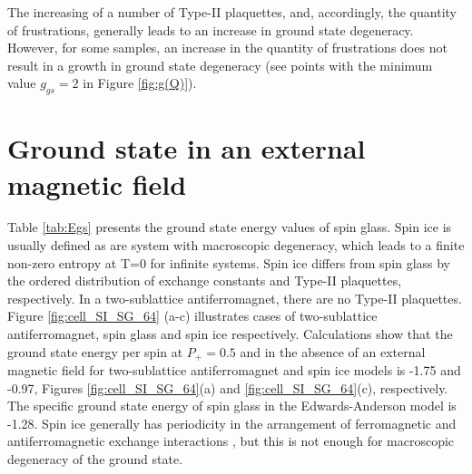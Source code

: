 \documentclass[preprint,12pt]{elsarticle}
\begin{document}
	The increasing of a number of Type-II plaquettes, and, accordingly, the quantity of frustrations, generally leads to an increase in ground state degeneracy. However, for some samples, an increase in the quantity of frustrations does not result in a growth in ground state degeneracy (see points with the minimum value $g_{gs}=2$ in Figure \ref{fig:g(Q)}). 
	
	\section{Ground state in an external magnetic field}
	
	Table \ref{tab:Egs} presents the ground state energy values of spin glass. Spin ice is usually defined as are system with macroscopic degeneracy, which leads to a finite non-zero entropy at T=0 for infinite systems. Spin ice differs from spin glass by the ordered distribution of exchange constants and Type-II plaquettes, respectively. In a two-sublattice antiferromagnet, there are no Type-II plaquettes. Figure \ref{fig:cell_SI_SG_64} (a-c) illustrates cases of two-sublattice antiferromagnet, spin glass and spin ice respectively. Calculations show that the ground state energy per spin at $P_+ = 0.5$ and in the absence of an external magnetic field for two-sublattice antiferromagnet and spin ice models is -1.75 and -0.97, Figures \ref{fig:cell_SI_SG_64}(a) and \ref{fig:cell_SI_SG_64}(c), respectively. The specific ground state energy of spin glass in the Edwards-Anderson model is -1.28. Spin ice generally has periodicity in the arrangement of ferromagnetic and antiferromagnetic exchange interactions \cite{peretyatko2017interplay, otsuka2018husimi, andriushchenko2019large, shevchenko2017effect, kato2022flux}, but this is not enough for macroscopic degeneracy of the ground state. 
	
\end{document}
